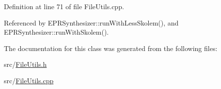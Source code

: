 Definition at line 71 of file File\-Utils.\-cpp.



Referenced by E\-P\-R\-Synthesizer\-::run\-With\-Less\-Skolem(), and E\-P\-R\-Synthesizer\-::run\-With\-Skolem().



The documentation for this class was generated from the following files\-:\begin{DoxyCompactItemize}
\item 
src/\hyperlink{FileUtils_8h}{File\-Utils.\-h}\item 
src/\hyperlink{FileUtils_8cpp}{File\-Utils.\-cpp}\end{DoxyCompactItemize}
